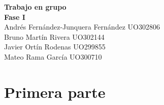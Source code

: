 \documentclass{article}
\begin{document}
\thispagestyle{empty}
\vfill
\begin{center}
    {\Huge \bfseries \sffamily Trabajo en grupo} \\[5ex]
    {\LARGE \bfseries \sffamily Fase I} \\[10ex]
    \Large {
        Andrés Fernández-Junquera Fernández UO302806\\[3ex]
        Bruno Martín Rivera UO302144\\[3ex]
        Javier Ortín Rodenas UO299855\\[3ex]
        Mateo Rama García UO300710
    }
\end{center}
\vfill 

\newpage
\section{Primera parte}
\end{document}
